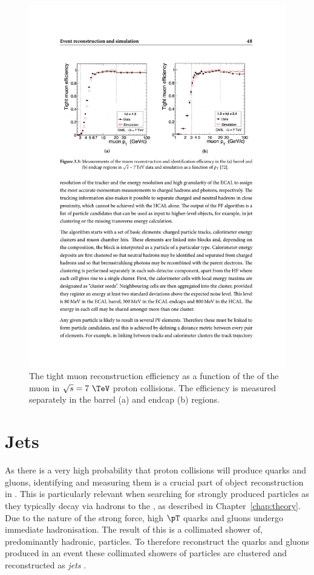 \begin{figure}
\begin{center}
\includegraphics[width=0.9\linewidth]{figs/reconstruction/muonEff} \end{center}
\caption{ The tight muon reconstruction efficiency as a function of the
\pt of the muon in $\sqrt{s}=7~\tev$ proton collisions. The efficiency
is measured separately in the barrel (a) and endcap (b) regions.
\cite{1748-0221-7-10-P10002}}
\label{fig:muonEff} \end{figure}

\section{Jets}
\label{sec:jets_reco}

As there is a very high probability that proton collisions will
produce quarks and gluons, identifying and measuring them is a crucial part of
object reconstruction in \CMS. This is particularly relevant when
searching for strongly produced \SUSY particles as they typically
decay via hadrons to the \LSP, as described in
Chapter~\ref{chap:theory}. Due to the nature of the strong force,
high $\pT$ quarks and gluons undergo immediate hadronisation. The
result of this is a collimated shower of, predominantly hadronic,
particles. To therefore reconstruct the quarks and gluons produced in
an event these collimated showers of particles are clustered and
reconstructed as \emph{jets} \cite{Salam2010}.

